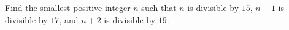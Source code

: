 Find the smallest positive integer $n$ such that $n$ is divisible by $15$, $n+1$ is divisible by $17$, and $n+2$ is divisible by $19$.
